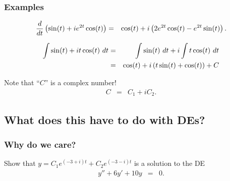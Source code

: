 \begin{frame}
  \frametitle{Examples}

  \begin{eqnarray*}
    \frac{d}{dt} \left( \sin(t) + i e^{2t} \cos(t) \right) & = & 
    \cos(t) + i \left( 2 e^{2t} \cos(t) - e^{2t} \sin(t) \right).
  \end{eqnarray*}

  \begin{eqnarray*}
    \int \sin(t) + i t \cos(t) ~ dt & = & 
    \int \sin(t) ~ dt + i \int t \cos(t) ~ dt \\
    & = & \cos(t) + i \left( t\sin(t) + \cos(t) \right) + C
  \end{eqnarray*}

  Note that ``$C$'' is a complex number!
  \begin{eqnarray*}
    C & = & C_1 + i C_2.
  \end{eqnarray*}

\end{frame}

\subsection{What does this have to do with DEs?}

\begin{frame}
  \frametitle{Why do we care?}

  Show that $y=C_1 e^{(-3+i)t} + C_2 e^{(-3-i)t}$ is a solution to the DE
  \begin{eqnarray*}
    y'' + 6y' + 10y & = & 0.
  \end{eqnarray*}

\end{frame}




